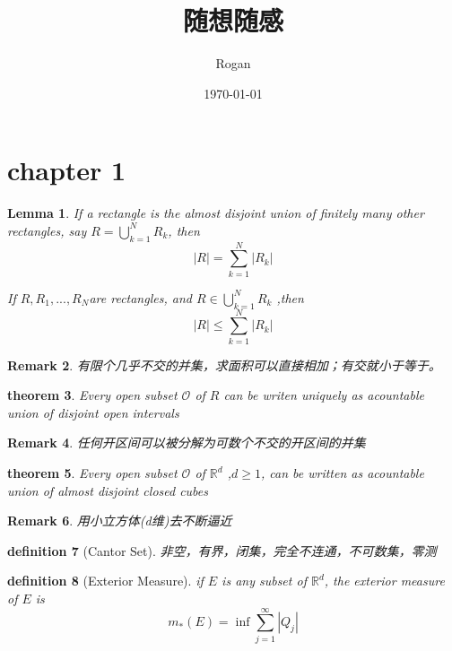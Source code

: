 \documentclass[12pt, a4paper, oneside]{ctexart}
\title{随想随感}
\author{Rogan}
\date{\today}
\newtheorem{theorem}{theorem}[section]
\newtheorem{definition}[theorem]{definition}
\newtheorem{lemma}[theorem]{Lemma}
\newtheorem{remark}[theorem]{Remark}
\begin{document}
\maketitle

\tableofcontents

\newpage
\section{chapter 1}

\begin{lemma}
    If a rectangle is the almost disjoint union of finitely many other rectangles, say $R=\bigcup _{k=1}^{N}R_k$, then$$|R|=\sum_{k=1}^N |R_k|$$

    If $R,R_1,. . . ,R_N $are rectangles, and $R\in \bigcup _{k=1}^{N}R_k$ ,then $$|R|\leq \sum_{k=1}^N |R_k|$$
\end{lemma}

\begin{remark}
    有限个几乎不交的并集，求面积可以直接相加；有交就小于等于。
\end{remark}

\begin{theorem}
    Every open subset $\mathcal{O} $ of $R$ can be writen uniquely as acountable union of disjoint open intervals
\end{theorem}

\begin{remark}
    任何开区间可以被分解为可数个不交的开区间的并集
\end{remark}

\begin{theorem}
    Every open subset $\mathcal{O} $ of $\mathbb{R} ^{d}$ ,$d\geq 1$, can be written as acountable union of almost disjoint closed cubes
\end{theorem}

\begin{remark}
    用小立方体(d维)去不断逼近
\end{remark}

\begin{definition}[Cantor Set]
    非空，有界，闭集，完全不连通，不可数集，零测
\end{definition}

\begin{definition}[Exterior Measure]
    
    if $E$ is any subset of $\mathbb{R} ^d$, the exterior measure of $E$ is $$m_{*}(E)=\inf \sum_{j=1}^{\infty}|Q_j|$$
\end{definition}
\end{document}
